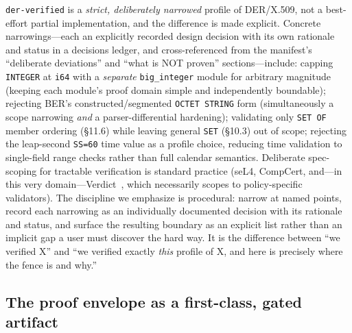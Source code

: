 \documentclass[10pt,twocolumn]{article}
\newcommand{\code}[1]{\texttt{\small #1}}
\newcommand{\crate}{\code{der-verified}}
\begin{document}
\crate{} is a \emph{strict, deliberately narrowed} profile of DER/X.509, not a
best-effort partial implementation, and the difference is made explicit.
Concrete narrowings---each an explicitly recorded design decision with its own
rationale and status in a decisions ledger, and cross-referenced from the
manifest's ``deliberate
deviations'' and ``what is NOT proven'' sections---include: capping
\code{INTEGER} at \code{i64} with a \emph{separate} \code{big\_integer} module
for arbitrary magnitude (keeping each module's proof domain simple and
independently boundable); rejecting BER's constructed/segmented \code{OCTET
STRING} form (simultaneously a scope narrowing \emph{and} a
parser-differential hardening); validating only \code{SET OF} member ordering
(\S11.6) while leaving general \code{SET} (\S10.3) out of scope; rejecting the
leap-second \code{SS=60} time value as a profile choice, reducing time
validation to single-field range checks rather than full calendar semantics.
Deliberate spec-scoping for tractable verification is standard practice
(seL4, CompCert, and---in this very domain---Verdict~\cite{verdict}, which
necessarily scopes to policy-specific validators). The discipline we emphasize
is procedural: narrow at named points, record each narrowing as an
individually documented decision with its rationale and status, and surface the
resulting boundary as an explicit list rather than an implicit gap a user must
discover the hard way.
It is the difference between ``we verified X'' and ``we verified exactly
\emph{this} profile of X, and here is precisely where the fence is and why.''

\subsection{The proof envelope as a first-class, gated artifact}
\label{sec:envelope}
\end{document}
